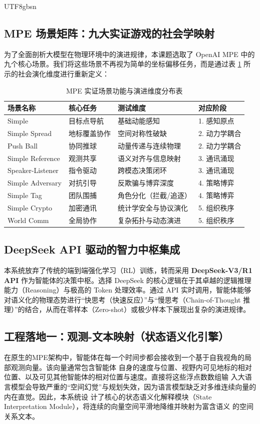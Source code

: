 \documentclass[11pt,a4paper]{article}
\begin{document}
\begin{CJK*}{UTF8}{gbsn}
\subsection{MPE 场景矩阵：九大实证游戏的社会学映射}
为了全面剖析大模型在物理环境中的演进规律，本课题选取了 OpenAI MPE 中的九个核心场景。我们将这些场景不再视为简单的坐标偏移任务，而是通过表 \ref{tab:mpe_games} 所示的社会演化维度进行重新定义：

\begin{table}[h!]
\centering
\caption{MPE 实证场景功能与演进维度分布表}
\label{tab:mpe_games}
\color{SDUBlue}
\begin{tabular}{@{}llll@{}}
\toprule
\textbf{场景名称} & \textbf{核心任务} & \textbf{测试维度} & \textbf{对应阶段} \\ \midrule
Simple & 目标点导航 & 基础动能感知 & 1. 感知原点 \\
Simple Spread & 地标覆盖协作 & 空间对称性破缺 & 2. 动力学耦合 \\
Push Ball & 协同推球 & 动量传递与连续物理 & 2. 动力学耦合 \\
Simple Reference & 观测共享 & 语义对齐与信息映射 & 3. 通讯涌现 \\
Speaker-Listener & 指令驱动 & 跨模态决策闭环 & 3. 通讯涌现 \\
Simple Adversary & 对抗引导 & 反欺骗与博弈深度 & 4. 策略博弈 \\
Simple Tag & 团队围捕 & 角色分化（拦截/追逐） & 4. 策略博弈 \\
Simple Crypto & 加密通讯 & 统计学安全与协议演化 & 5. 组织秩序 \\
World Comm & 全局协作 & 复杂拓扑与动态演进 & 5. 组织秩序 \\ \bottomrule
\end{tabular}
\end{table}

\subsection{DeepSeek API 驱动的智力中枢集成}
本系统放弃了传统的端到端强化学习（RL）训练，转而采用 \textbf{DeepSeek-V3/R1 API} 作为智能体的决策中枢。选择 DeepSeek 的核心逻辑在于其卓越的逻辑推理能力（Reasoning）与极高的 Token 处理效率。通过 API 实时调用，智能体能够对语义化的物理态势进行“快思考（快速反应）”与“慢思考（Chain-of-Thought 推理）”的结合，从而在零样本（Zero-shot）或极少样本下展现出复杂的演进规律。

\subsection{工程落地一：观测-文本映射（状态语义化引擎）} 
在原生的MPE架构中，智能体在每一个时间步都会接收到一个基于自我视角的局部观测向量。该向量通常包含智能体
自身的速度与位置、视野内可见地标的相对位置、以及可见其他智能体的相对位置与速度。直接将这些浮点数数组输
入大语言模型会导致严重的“空间幻觉”与规划失效，因为语言模型缺乏对多维连续向量的内在直觉。因此，本系统设
计了核心的状态语义化解释模块（State Interpretation Module），将连续的向量空间平滑地降维并映射为富含语义
的空间关系文本。  


\end{CJK*}
\end{document}
